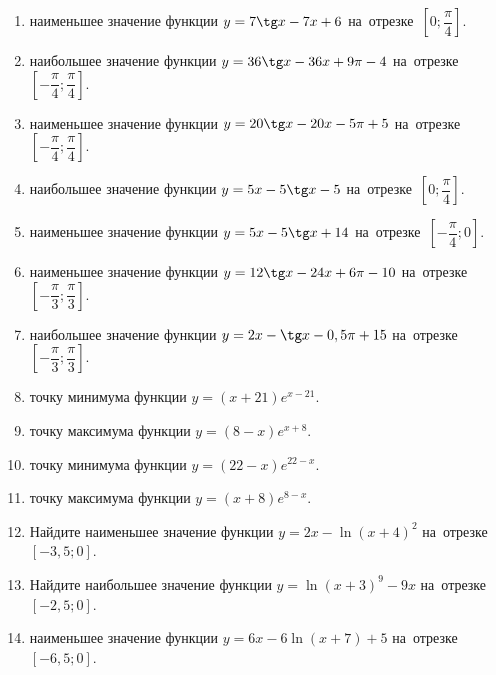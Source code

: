 \documentclass[a4paper,10pt]{article}
\begin{document}
\begin{enumerate}
\item {} наименьшее значение функции $y=7\tg x-7x+6$ на~отрезке~$\left[0;\dfrac{\pi }{4}\right]$.

\item {} наибольшее значение функции $y=36\tg x-36x+9\pi -4$ на~отрезке~$\left[-\dfrac{\pi }{4};\dfrac{\pi }{4}\right]$.

\item {} наименьшее значение функции $y=20\tg x-20x-5\pi +5$ на~отрезке~$\left[-\dfrac{\pi }{4};\dfrac{\pi }{4}\right]$.

\item {} наибольшее значение функции $y=5x-5\tg x-5$ на~отрезке~$\left[0;\dfrac{\pi }{4}\right]$.

\item {} наименьшее значение функции $y=5x-5\tg x+14$ на~отрезке~$\left[-\dfrac{\pi }{4};0\right]$.

\item {} наименьшее значение функции $y=12\tg x-24x+6\pi -10$ на~отрезке~$\left[-\dfrac{\pi }{3};\dfrac{\pi }{3}\right]$.

\item {} наибольшее значение функции $y=2x-\tg x-0,5\pi +15$ на~отрезке~$\left[-\dfrac{\pi }{3};\dfrac{\pi }{3}\right]$.

\item {} точку минимума функции $y=\left(x+21\right)e^{x-21}$.

\item {} точку максимума функции $y=\left(8-x\right)e^{x+8}$.

\item {} точку минимума функции $y=\left(22-x\right)e^{22-x}$.

\item {} точку максимума функции $y=\left(x+8\right)e^{8-x}$.

\item Найдите наименьшее значение функции $y=2x-\ln \left(x+4\right)^2$ на~отрезке~$\left[-3,5;0\right]$.

\item Найдите наибольшее значение функции $y=\ln \left(x+3\right)^9-9x$ на~отрезке~$\left[-2,5;0\right]$.

\item {} наименьшее значение функции $y=6x-6\ln \left(x+7\right)+5$ на~отрезке~$\left[-6,5;0\right]$.


\end{enumerate}
\end{document}
